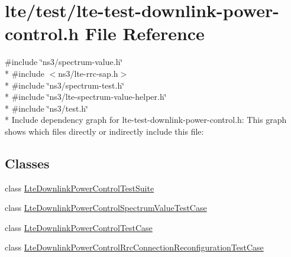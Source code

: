 \hypertarget{lte-test-downlink-power-control_8h}{}\section{lte/test/lte-\/test-\/downlink-\/power-\/control.h File Reference}
\label{lte-test-downlink-power-control_8h}
{\ttfamily \#include \char`\"{}ns3/spectrum-\/value.\+h\char`\"{}}\\*
{\ttfamily \#include $<$ns3/lte-\/rrc-\/sap.\+h$>$}\\*
{\ttfamily \#include \char`\"{}ns3/spectrum-\/test.\+h\char`\"{}}\\*
{\ttfamily \#include \char`\"{}ns3/lte-\/spectrum-\/value-\/helper.\+h\char`\"{}}\\*
{\ttfamily \#include \char`\"{}ns3/test.\+h\char`\"{}}\\*
Include dependency graph for lte-\/test-\/downlink-\/power-\/control.h\+:
This graph shows which files directly or indirectly include this file\+:
\subsection*{Classes}
\begin{DoxyCompactItemize}
\item 
class \hyperlink{classLteDownlinkPowerControlTestSuite}{Lte\+Downlink\+Power\+Control\+Test\+Suite}
\item 
class \hyperlink{classLteDownlinkPowerControlSpectrumValueTestCase}{Lte\+Downlink\+Power\+Control\+Spectrum\+Value\+Test\+Case}
\item 
class \hyperlink{classLteDownlinkPowerControlTestCase}{Lte\+Downlink\+Power\+Control\+Test\+Case}
\item 
class \hyperlink{classLteDownlinkPowerControlRrcConnectionReconfigurationTestCase}{Lte\+Downlink\+Power\+Control\+Rrc\+Connection\+Reconfiguration\+Test\+Case}
\end{DoxyCompactItemize}
